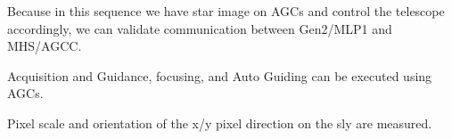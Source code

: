 \smallskip

Because in this sequence we have star image on AGCs  and control the telescope accordingly, we can validate communication between Gen2/MLP1 and MHS/AGCC.

\begin{itembox}[l]{}
Acquisition and Guidance, focusing, and Auto Guiding can be executed using AGCs.

Pixel scale and orientation of the x/y pixel direction on the sly are measured.

\end{itembox}